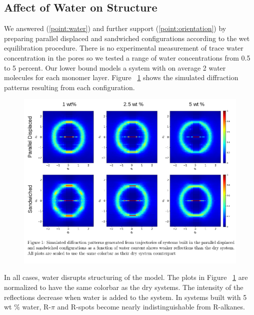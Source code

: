 \documentclass{article}
\begin{document}
  \subsection{Affect of Water on Structure}

  We answered (\ref{point:water}) and further support (\ref{point:orientation})
  by preparing parallel displaced and sandwiched configurations according to the
  wet equilibration procedure. There is no experimental measurement of trace
  water concentration in the pores so we tested a range of water concentrations
  from 0.5 to 5 percent. Our lower bound models a system with on average 2 water
  molecules for each monomer layer. Figure ~\ref{fig:solvation} shows the
  simulated diffraction patterns resulting from each configuration.

  \begin{figure}
	\centering
	\includegraphics[width=\textwidth]{solvation.png}  %
	\caption{}
	\label{fig:solvation}
  \end{figure}

  In all cases, water disrupts structuring of the model. The plots in Figure
  ~\ref{fig:solvation} are normalized to have the same colorbar as the dry
  systems. The intensity of the reflections decrease when water is added to the
  system. In systems built with 5 wt \% water, R-$\pi$ and R-spots
  become nearly indistinguishable from R-alkanes.
\end{document}
